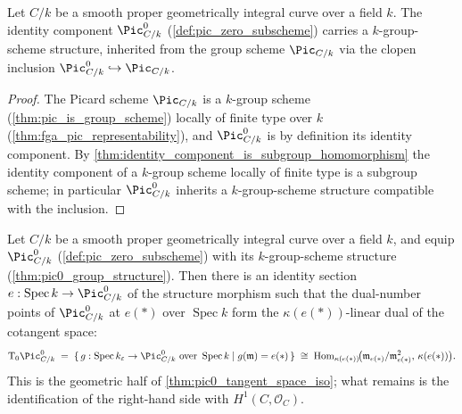\begin{theorem}\leanok
  \label{thm:pic0_group_structure}
  Let \(C/k\) be a smooth proper geometrically integral curve over a
  field \(k\). The identity component \(\Pic^0_{C/k}\)
  (\cref{def:pic_zero_subscheme}) carries a \(k\)-group-scheme
  structure, inherited from the group scheme \(\Pic_{C/k}\) via the
  clopen inclusion \(\Pic^0_{C/k} \hookrightarrow \Pic_{C/k}\).
\end{theorem}

\begin{proof}\leanok
  The Picard scheme \(\Pic_{C/k}\) is a \(k\)-group scheme
  (\cref{thm:pic_is_group_scheme}) locally of finite type over \(k\)
  (\cref{thm:fga_pic_representability}), and \(\Pic^0_{C/k}\) is by
  definition its identity component. By
  \cref{thm:identity_component_is_subgroup_homomorphism} the identity
  component of a \(k\)-group scheme locally of finite type is a
  subgroup scheme; in particular \(\Pic^0_{C/k}\) inherits a
  \(k\)-group-scheme structure compatible with the inclusion.
\end{proof}

\begin{theorem}\leanok
  \label{thm:pic0_tangent_cotangent_dual}
  Let \(C/k\) be a smooth proper geometrically integral curve over a
  field \(k\), and equip \(\Pic^0_{C/k}\)
  (\cref{def:pic_zero_subscheme}) with its \(k\)-group-scheme
  structure (\cref{thm:pic0_group_structure}). Then there
  is an identity section \(e : \operatorname{Spec} k \to
  \Pic^0_{C/k}\) of the structure morphism such that the dual-number
  points of \(\Pic^0_{C/k}\) at \(e(*)\) over \(\operatorname{Spec} k\)
  form the \(\kappa(e(*))\)-linear dual of the cotangent space:
  \[
    \tu T_0 \Pic^0_{C/k}
    \;=\;
    \{\, g : \operatorname{Spec} k_\varepsilon \to \Pic^0_{C/k}
        \text{ over } \operatorname{Spec} k
        \mid g(\mathfrak m) = e(*) \,\}
    \;\cong\;
    \operatorname{Hom}_{\kappa(e(*))}\!\bigl(
      \mathfrak m_{e(*)}/\mathfrak m_{e(*)}^2,\, \kappa(e(*))\bigr).
  \]
  This is the geometric half of \cref{thm:pic0_tangent_space_iso};
  what remains is the identification of the right-hand side with
  \(H^1(C, \mathcal O_C)\).
\end{theorem}

